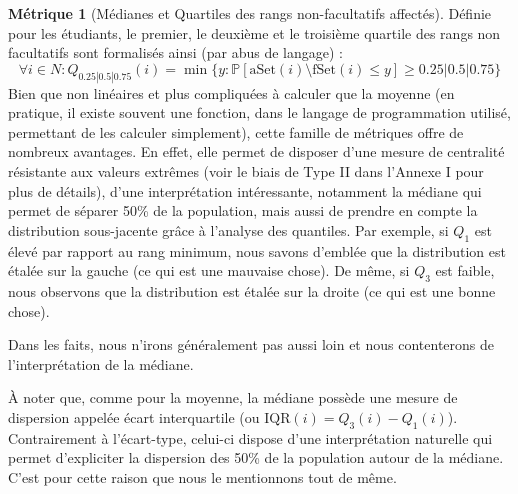 \documentclass{rapport}
\theoremstyle{definition}
\theoremstyle{remark}
\theoremstyle{plain}
\theoremstyle{definition}
\newtheorem*{metric}{Métrique}
\theoremstyle{definition}
\theoremstyle{remark}
\theoremstyle{definition}
\begin{document}
\begin{metric}[Médianes et Quartiles des rangs non-facultatifs affectés]
    Définie pour les étudiants, le premier, le deuxième et le troisième quartile des rangs non facultatifs sont formalisés ainsi (par abus de langage) :
    $$
    \forall i\in N : Q_{0.25|0.5|0.75}(i) = \min\{y : \mathbb{P}[\text{aSet}(i)\setminus\text{fSet}(i)\le y]\ge 0.25|0.5|0.75\}
    $$
    Bien que non linéaires et plus compliquées à calculer que la moyenne (en pratique, il existe souvent une fonction, dans le langage de programmation utilisé, permettant de les calculer simplement), cette famille de métriques offre de nombreux avantages.
    En effet, elle permet de disposer d'une mesure de centralité résistante aux valeurs extrêmes (voir le biais de Type II dans l'Annexe I pour plus de détails), d'une interprétation intéressante, notamment la médiane qui permet de séparer 50\% de la population, mais aussi de prendre en compte la distribution sous-jacente grâce à l'analyse des quantiles.
    Par exemple, si $Q_1$ est élevé par rapport au rang minimum, nous savons d'emblée que la distribution est étalée sur la gauche (ce qui est une mauvaise chose).
    De même, si $Q_3$ est faible, nous observons que la distribution est étalée sur la droite (ce qui est une bonne chose).

    Dans les faits, nous n'irons généralement pas aussi loin et nous contenterons de l'interprétation de la médiane.
\end{metric}

À noter que, comme pour la moyenne, la médiane possède une mesure de dispersion appelée écart interquartile (ou $\text{IQR}(i) = Q_3(i) - Q_1(i)$).
Contrairement à l'écart-type, celui-ci dispose d'une interprétation naturelle qui permet d'expliciter la dispersion des 50\% de la population autour de la médiane.
C'est pour cette raison que nous le mentionnons tout de même.
\end{document}
